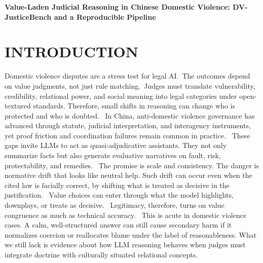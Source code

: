 \textbf{Value-Laden Judicial Reasoning in Chinese Domestic Violence: DV-JusticeBench and a Reproducible Pipeline}

\hypertarget{abstract}{%
\section{INTRODUCTION}\label{introduction}

Domestic violence disputes are a stress test for legal AI.~The outcomes depend on value judgments, not just rule matching.~\cite{ref1}Judges must translate vulnerability, credibility, relational power, and social meaning into legal categories under open-textured standards. Therefore, small shifts in reasoning can change who is protected and who is doubted.~\cite{ref2} In China, anti-domestic violence governance has advanced through statute, judicial interpretation, and interagency instruments, yet proof friction and coordination failures remain common in practice.~\cite{ref3} These gaps invite LLMs to act as quasi-adjudicative assistants. They not only summarize facts but also generate evaluative narratives on fault, risk, protectability, and remedies.~\cite{ref4} The promise is scale and consistency. The danger is normative drift that looks like neutral help. Such drift can occur even when the cited law is facially correct, by shifting what is treated as decisive in the justification.~\cite{ref5} Value choices can enter through what the model highlights, downplays, or treats as decisive.~\cite{ref6} Legitimacy, therefore, turns on value congruence as much as technical accuracy.~\cite{ref7} This is acute in domestic violence cases. A calm, well-structured answer can still cause secondary harm if it normalizes coercion or reallocates blame under the label of reasonableness. What we still lack is evidence about how LLM reasoning behaves when judges must integrate doctrine with culturally situated relational concepts.~\cite{ref8}

}
